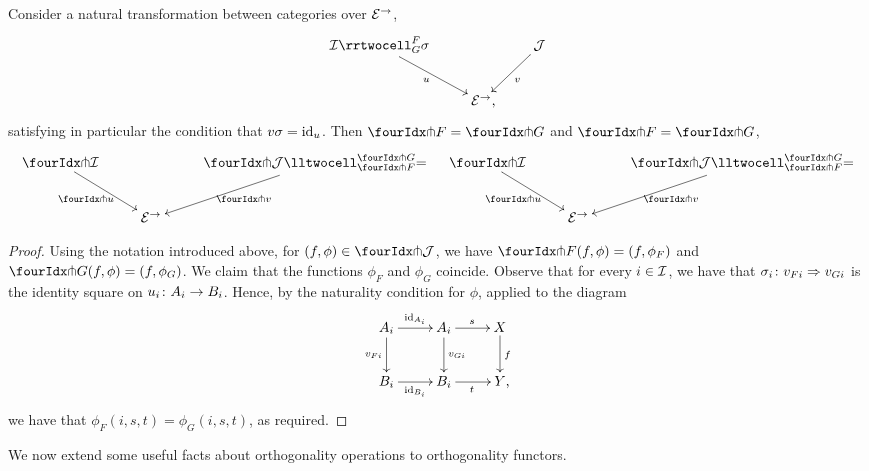 \documentclass[reqno,10pt,a4paper,oneside]{amsart}
\begin{document}
\begin{proposition} \label{thm:orth-nat}
Consider a natural transformation between categories over $\catE^\to$,
\[
\xymatrix{
  \cal{I}
  \rrtwocell_G^F{\sigma}
 \ar[dr]_{u}
&&
  \cal{J}
  \ar[dl]^{v}
\\&
  \catE^\to \rlap{,}
}
\]
satisfying in particular the condition that $v \sigma = \id_u$.
Then $\liftr{F} = \liftr{G}$ and $\liftl{F} = \liftl{G}$,
\begin{align*}
\xymatrix{
  \liftr{\cal{I}}
  \ar[dr]_{\liftr{u}}
&&
  \liftr{\cal{J}}
  \lltwocell_{\liftr{F}}^{\liftr{G}}{=}
  \ar[dl]^{\liftr{v}}
\\&
  \catE^\to
}
&&
\xymatrix{
  \liftl{\cal{I}}
  \ar[dr]_{\liftl{u}}
&&
  \liftl{\cal{J}}
  \lltwocell_{\liftl{F}}^{\liftl{G}}{=}
  \ar[dl]^{\liftl{v}}
\\&
  \catE^\to
}
\end{align*}
\end{proposition}

\begin{proof} Using the notation introduced above, for $(f, \phi) \in \liftr{\cal{J}}$, we have $\liftr{F}(f, \phi) = (f, \phi_F)$ and $\liftr{G}(f, \phi) = (f, \phi_G)$.
We claim that the functions $\phi_F$ and $\phi_G$ coincide.
Observe that for every $i \in \cal{I}$, we have that $\sigma_i \co v_{Fi} \Rightarrow v_{Gi}$ is the identity square on $u_i \co A_i \to B_i$.
Hence, by the naturality condition for $\phi$, applied to the diagram
\[
\xymatrix{
  A_i \ar[r]^{\id_{A_i}} \ar[d]_{v_{Fi}} & A_i \ar[d]^{v_{Gi}} \ar[r]^{s} & X \ar[d]^{f} \\
  B_i \ar[r]_{\id_{B_i}} & B_i \ar[r]_{t} & Y
\rlap{,}}
\]
we have that $\phi_F(i, s, t) = \phi_G(i, s, t)$, as required.
\end{proof}

We now extend some useful facts about orthogonality operations to orthogonality functors.
\end{document}
